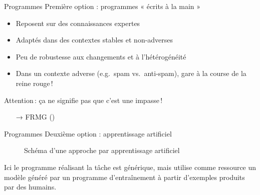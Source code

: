 \documentclass[hyperref={unicode}, xcolor={svgnames}, french]{beamer}
\begin{document}
\begin{frame}{Programmes}
    Première option : programmes « écrits à la main »
    \begin{itemize}
        \item Reposent sur des connaissances expertes
        \item Adaptés dans des contextes stables et non-adverses
        \item Peu de robustesse aux changements et à l'hétérogénéité
        \item Dans un contexte adverse (e.g.\ spam vs.\ anti-spam), gare à la course de la reine rouge !
    \end{itemize}
    Attention : ça ne signifie pas que c'est une impasse !
    \begin{itemize}
        \item[→] FRMG ()
    \end{itemize}
\end{frame}

\begin{frame}[fragile=singleslide]{Programmes}
    Deuxième option : apprentissage artificiel
    \begin{figure}
        \tikzset{external/export=true}
        \caption{Schéma d'une approche par apprentissage artificiel}
    \end{figure}
    Ici le \textcolor{highlighta}{programme réalisant la tâche} est générique, mais utilise comme ressource un \textcolor{highlight3}{modèle} généré par un \textcolor{highlight6}{programme d'entraînement} à partir d'\textcolor{highlight7}{exemples} produits par des humains.
\end{frame}
\end{document}
